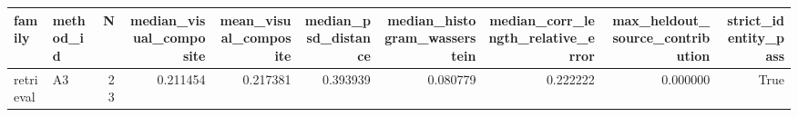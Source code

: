 \begin{tabular}{llrrrrrrrr}
\toprule
family & method_id & N & median_visual_composite & mean_visual_composite & median_psd_distance & median_histogram_wasserstein & median_corr_length_relative_error & max_heldout_source_contribution & strict_identity_pass \\
\midrule
retrieval & A3 & 23 & 0.211454 & 0.217381 & 0.393939 & 0.080779 & 0.222222 & 0.000000 & True \\
\bottomrule
\end{tabular}
